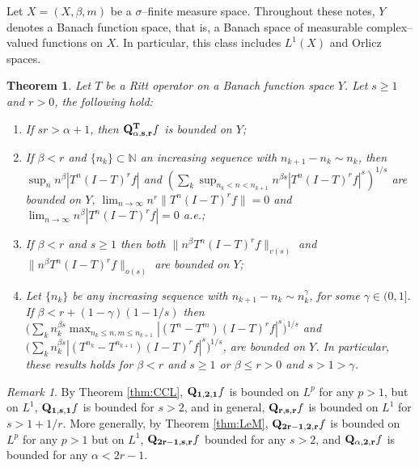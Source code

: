 \documentclass[11pt]{amsart}
\newtheorem{thm}{Theorem}[section]
\theoremstyle{definition}
\theoremstyle{remark}
\newtheorem*{xrem}{Remark}
\begin{document}
Let $X=(X,\beta,m)$ be a $\sigma$--finite measure space. 
Throughout these notes, $Y$ denotes a Banach function space, that is, a Banach space of measurable complex--valued functions on $X$. In particular, this class includes $L^1(X)$ and Orlicz spaces.
%
\begin{thm} \label{thm:RittResult} Let 
$T$ be a Ritt operator on a Banach function space $Y$.  
Let $s\ge 1$ and $r> 0$, the following hold:
\begin{enumerate}
\item If $sr>\alpha+1$, then ${\bf Q^T_{\alpha,s,r}}f$ 
is bounded on $Y$; %
\item If $\beta<r$ and $\{n_k\}\subset \mathbb N$ an increasing sequence with $n_{k+1}-n_k\sim n_k$, then  
$\sup_n n^{\beta} |T^n (I- T)^{r} f|$ and
$\left(\sum_k  \sup_{n_k< n<n_{k+1}} n^{\beta s} |T^n (I- T)^{r} f|^s\right)^{1/s}$
are bounded on $Y$, %
 $\lim_{n\to\infty} n^{r} \lVert T^n (I- T)^{r} f\rVert=0$ and $\lim_{n\to \infty} n^{\beta} |T^n (I- T)^{r}f | = 0$ a.e.;
\item  If $\beta<r$ and $s\ge 1$ 
then both  $\lVert n^{\beta} T^n(I-T)^r f\rVert_{v(s)}$ and  $\lVert n^{\beta} T^n(I-T)^r f\rVert_{o(s)}$ are bounded on  $Y$;  %
\item Let $\{n_k\}$ be any increasing sequence with $ n_{k+1} -n_k \sim n_k^{\gamma}$, for some $\gamma \in(0,1]$. 
If  $\beta< r+(1-\gamma)(1-1/s)$ %
then  %
$\Big( \sum_k n_k^{\beta s}  \max_{ n_k\le n,m\le n_{k+1} } |(T^n -T^{m})(I-T)^r  f|^s \Big)^{1/s} $ and
$\Big( \sum_k n_k^{\beta s} |(T^{n_k}-T^{n_{k+1}}) (I-T)^r  f|^s \Big)^{1/s}$,
are bounded on  $Y$. In particular, these results holds for $\beta< r$ and $s\ge 1$ or $\beta\le r>0$ and $s> 1>\gamma$.  %
\end{enumerate}
\end{thm}

% 
\begin{xrem} 
By Theorem \ref{thm:CCL},  ${\bf Q_{1,2,1}}f$  is bounded on $L^p$ for any $p>1$, but on $L^1$, 
${\bf Q_{1,s,1}}f$ is bounded for $s>2$, and in general,  ${\bf Q_{r,s,r}}f$ is bounded on $L^1$ for $s>1+1/r$.
More generally, by Theorem \ref{thm:LeM}, ${\bf Q_{2r-1,2,r}}f$ is bounded on $L^p$ for any $p>1$ but on $L^1$,
 ${\bf Q_{2r-1,s,r}}f$ bounded  for any $s>2$,  and ${\bf Q_{\alpha,2,r}}f$ is bounded  for any $\alpha<2r-1$.
\end{xrem}
\end{document}
